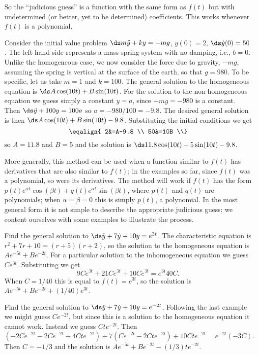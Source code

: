 So the ``judicious guess'' is a function with the same form as $f(t)$
but with undetermined (or better, yet to be determined)
coefficients. This works whenever $f(t)$ is a polynomial.

\begin{example} Consider the initial value problem $\ds m\ddot y +ky=-mg$,
$y(0)=2$, $\ds\dot y(0)=50$. The left hand side represents a mass-spring
system with no damping, i.e., $b=0$. Unlike the homogeneous case, we
now consider the force due to gravity, $-mg$, assuming the spring is
vertical at the surface of the earth, so that $g=980$. To be specific,
let us take $m=1$ and $k=100$. The general solution to the homogeneous
equation is $\ds A\cos(10t)+B\sin(10t)$. For the solution to the 
non-homogeneous equation we guess simply a constant $y=a$, since $-mg=-980$
is a constant. Then $\ds \ddot y+100y= 100a$ so $a=-980/100=-9.8$. The
desired general solution is then $\ds A\cos(10t)+B\sin(10t)-9.8$.
Substituting the initial conditions we get
$$\eqalign{
2&=A-9.8 \\
50&=10B \\}
$$
so $A=11.8$ and $B=5$ and the solution is $\ds 11.8\cos(10t)+5\sin(10t)-9.8$.
\end{example}

More generally, this method can be used when a function similar to
$f(t)$ has derivatives that are also similar to $f(t)$; in the
examples so far, since $f(t)$ was a polynomial, so were its derivatives.
The method will work if $f(t)$ has the form $p(t)e^{\alpha t}\cos(\beta t)+
q(t)e^{\alpha t}\sin(\beta t)$, where $p(t)$ and $q(t)$ are
polynomials; when $\alpha=\beta=0$ this is simply $p(t)$, a
polynomial. In the most general form it is not simple to describe the
appropriate judicious guess; we content ourselves with some examples
to illustrate the process.

\begin{example} Find the general solution to $\ds\ddot y+7\dot
y+10y=e^{3t}$. The characteristic equation is $r^2+7r+10=(r+5)(r+2)$,
so the solution to the homogeneous equation is
$Ae^{-5t}+Be^{-2t}$. For a particular solution to the inhomogeneous
equation we guess $Ce^{3t}$. Substituting we get
$$
9Ce^{3t}+21Ce^{3t}+10Ce^{3t}=e^{3t}40C.
$$
When $C=1/40$ this is equal to $f(t)=e^{3t}$, so the solution is
$Ae^{-5t}+Be^{-2t}+(1/40)e^{3t}$.
\end{example}

\begin{example} Find the general solution to $\ds\ddot y+7\dot
y+10y=e^{-2t}$. Following the last example we might guess
$Ce^{-2t}$, but since this is a solution to the homogeneous equation
it cannot work. Instead we guess $Cte^{-2t}$. Then
$$
(-2Ce^{-2t}-2Ce^{-2t}+4Cte^{-2t})+7(Ce^{-2t}-2Cte^{-2t})+10Cte^{-2t}
=e^{-2t}(-3C).
$$
Then $C=-1/3$ and the solution is $Ae^{-5t}+Be^{-2t}-(1/3)te^{-2t}$.
\end{example}

